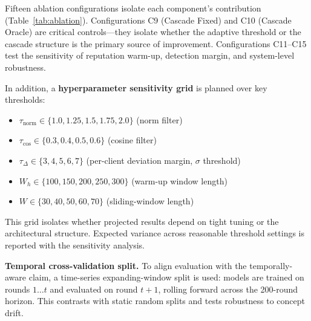 \documentclass[10pt,journal]{IEEEtran}
\begin{document}
Fifteen ablation configurations isolate each component's contribution (Table~\ref{tab:ablation}). Configurations C9 (Cascade Fixed) and C10 (Cascade Oracle) are critical controls---they isolate whether the adaptive threshold or the cascade structure is the primary source of improvement. Configurations C11--C15 test the sensitivity of reputation warm-up, detection margin, and system-level robustness.

In addition, a \textbf{hyperparameter sensitivity grid} is planned over key thresholds:
\begin{itemize}
  \item $\tau_{\text{norm}} \in \{1.0, 1.25, 1.5, 1.75, 2.0\}$ (norm filter)
  \item $\tau_{\text{cos}} \in \{0.3, 0.4, 0.5, 0.6\}$ (cosine filter)
  \item $\tau_\Delta \in \{3, 4, 5, 6, 7\}$ (per-client deviation margin, $\sigma$ threshold)
  \item $W_h \in \{100, 150, 200, 250, 300\}$ (warm-up window length)
  \item $W \in \{30, 40, 50, 60, 70\}$ (sliding-window length)
\end{itemize}
This grid isolates whether projected results depend on tight tuning or the architectural structure. Expected variance across reasonable threshold settings is reported with the sensitivity analysis.

\textbf{Temporal cross-validation split.} To align evaluation with the temporally-aware claim, a time-series expanding-window split is used: models are trained on rounds $1\ldots t$ and evaluated on round $t+1$, rolling forward across the 200-round horizon. This contrasts with static random splits and tests robustness to concept drift.
\end{document}
